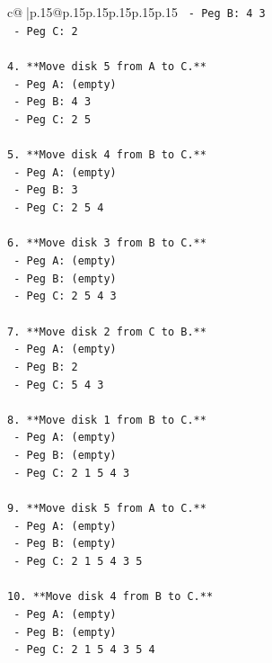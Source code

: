\documentclass{article}
\begin{document}
{\begin{supertabular}{c@{$\;$}|p{.15\linewidth}@{}p{.15\linewidth}p{.15\linewidth}p{.15\linewidth}p{.15\linewidth}p{.15\linewidth}}
{{{\texttt{   {-} Peg B: 4 3} \\
\texttt{   {-} Peg C: 2} \\
\\ 
\texttt{4. **Move disk 5 from A to C.**} \\
\texttt{   {-} Peg A: (empty)} \\
\texttt{   {-} Peg B: 4 3} \\
\texttt{   {-} Peg C: 2 5} \\
\\ 
\texttt{5. **Move disk 4 from B to C.**} \\
\texttt{   {-} Peg A: (empty)} \\
\texttt{   {-} Peg B: 3} \\
\texttt{   {-} Peg C: 2 5 4} \\
\\ 
\texttt{6. **Move disk 3 from B to C.**} \\
\texttt{   {-} Peg A: (empty)} \\
\texttt{   {-} Peg B: (empty)} \\
\texttt{   {-} Peg C: 2 5 4 3} \\
\\ 
\texttt{7. **Move disk 2 from C to B.**} \\
\texttt{   {-} Peg A: (empty)} \\
\texttt{   {-} Peg B: 2} \\
\texttt{   {-} Peg C: 5 4 3} \\
\\ 
\texttt{8. **Move disk 1 from B to C.**} \\
\texttt{   {-} Peg A: (empty)} \\
\texttt{   {-} Peg B: (empty)} \\
\texttt{   {-} Peg C: 2 1 5 4 3} \\
\\ 
\texttt{9. **Move disk 5 from A to C.**} \\
\texttt{   {-} Peg A: (empty)} \\
\texttt{   {-} Peg B: (empty)} \\
\texttt{   {-} Peg C: 2 1 5 4 3 5} \\
\\ 
\texttt{10. **Move disk 4 from B to C.**} \\
\texttt{    {-} Peg A: (empty)} \\
\texttt{    {-} Peg B: (empty)} \\
\texttt{    {-} Peg C: 2 1 5 4 3 5 4} \\
\\ 
}}}
\end{supertabular}}
\end{document}
